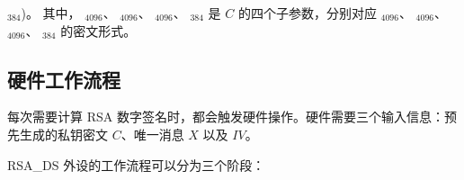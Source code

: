 \documentclass[main\_\_CN.tex]{subfiles}
\begin{document}
\begin{itemize}
\begin{math}
            [\widehat{Box}]_{384}
            \end{math})。
            其中，
            \begin{math} [\widehat{Y}]_{4096} \end{math}、
            \begin{math} [\widehat{M}]_{4096} \end{math}、
            \begin{math} [\widehat{ \overline{r} }]_{4096} \end{math}、
            \begin{math} [\widehat{Box}]_{384} \end{math}
            是 \begin{math}C\end{math} 的四个子参数，分别对应
            \begin{math} [Y]_{4096} \end{math}、
            \begin{math} [M]_{4096} \end{math}、
            \begin{math} [\overline{r}]_{4096} \end{math}、
            \begin{math} [Box]_{384} \end{math}
            的密文形式。

\end{itemize}

\subsection{硬件工作流程}
\label{sec:digsig-hardware-level-operation}

每次需要计算 RSA 数字签名时，都会触发硬件操作。硬件需要三个输入信息：预先生成的私钥密文 \begin{math}C\end{math}、唯一消息 \begin{math}X\end{math} 以及 \begin{math}IV\end{math}。

RSA\_DS 外设的工作流程可以分为三个阶段：
\end{document}
